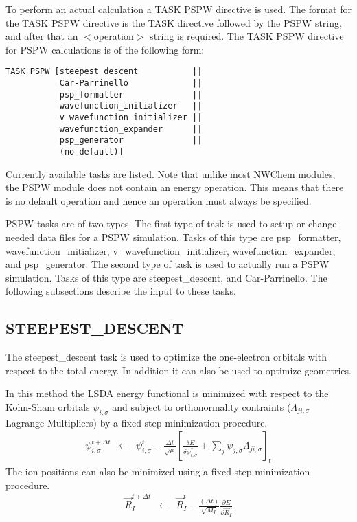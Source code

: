 To perform an actual calculation a TASK PSPW directive is used.
The format for the TASK PSPW directive is the TASK directive followed by the 
PSPW string, and after that an $<$operation$>$ string is required.  The 
TASK PSPW directive for PSPW calculations is of the following form:
\begin{verbatim}
TASK PSPW [steepest_descent           ||
           Car-Parrinello             ||
           psp_formatter              ||
           wavefunction_initializer   ||
           v_wavefunction_initializer ||
           wavefunction_expander      ||
           psp_generator              ||
           (no default)]
\end{verbatim}
Currently available tasks are listed.  Note that unlike most 
NWChem modules, the PSPW module does not contain an energy operation.  
This means that there is no default operation and hence an operation must 
always be specified.

PSPW tasks are of two types.  The first type of 
task is used to setup or change needed data files for a 
PSPW simulation.  Tasks of this type are psp\_formatter, 
wavefunction\_initializer, v\_wavefunction\_initializer, 
wavefunction\_expander, and psp\_generator.  The second type 
of task is used to actually run a PSPW simulation.  Tasks 
of this type are steepest\_descent, and Car-Parrinello.
The following subsections describe the input to these tasks.

\subsection{STEEPEST\_DESCENT} 

The steepest\_descent task is used to optimize the one-electron orbitals
with respect to the total energy.  In addition it can also be used to optimize
geometries.  

In this method the LSDA energy functional is minimized with
respect to the Kohn-Sham orbitals {$\psi_{i,\sigma}$} and subject to 
orthonormality contraints ($\Lambda_{ji,\sigma}$ Lagrange Multipliers) 
by a fixed step minimization procedure.
\begin{eqnarray}
\psi_{i,\sigma}^{t+ \Delta t} 
                   &\leftarrow& 
                     \psi_{i,\sigma}^{t} 
                      - \frac{\Delta t}{\sqrt{\mu}} 
                        \left[ 
                           \frac{\delta E}{\delta \psi_{i,\sigma}^{*}}
                            + \sum_{j} \psi_{j,\sigma} \Lambda_{ji,\sigma} 
                        \right]_{t}
\label{eq:sd2}
\end{eqnarray}
The ion positions can also be minimized using a fixed step minimization 
procedure.
\begin{eqnarray}
\vec{R}_I^{t+\Delta t} &\leftarrow& 
                      \vec{R}_I^{t}
                    - \frac{(\Delta t)}{\sqrt{M_I}} 
                       \frac{\partial E}{\partial \vec{R}_I}
\label{eq:sd3}
\end{eqnarray}

